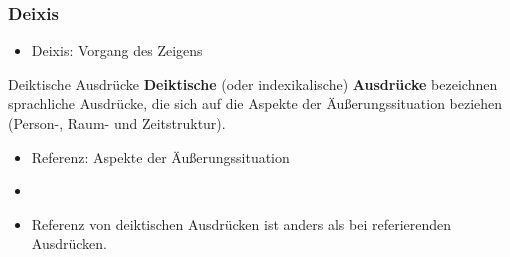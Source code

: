\begin{frame}
\frametitle{Deixis}

\begin{itemize}
	\item Deixis: Vorgang des Zeigens
\end{itemize}

	\begin{block}{Deiktische Ausdrücke}
	\textbf{Deiktische} (oder indexikalische) \textbf{Ausdrücke} bezeichnen sprachliche Ausdrücke, die sich auf die Aspekte der Äu\ss{}erungssituation beziehen (Person-, Raum- und Zeitstruktur).
	\end{block}

\begin{itemize}
		\item Referenz: Aspekte der Äu\ss{}erungssituation
		\item[]
		\item Referenz von deiktischen Ausdrücken ist anders als bei referierenden Ausdrücken.
\end{itemize}

\end{frame}



